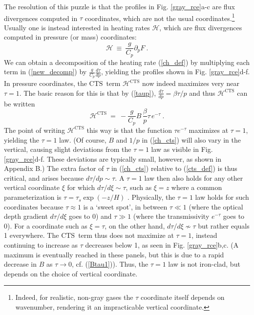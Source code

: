 \documentclass{ametsoc}
\newcommand{\beqn}{\begin{equation}}
\newcommand{\eeqn}{\end{equation}}
\newcommand{\eqnref}[1]{(\ref{#1})}
\newcommand{\der}[2]{\ensuremath{\frac{d #1}{d #2}}}
\newcommand{\ppp}{\ensuremath{\partial_p}}
\newcommand{\Cp}{\ensuremath{C_p}}
\newcommand{\ch}{\ensuremath{\mathcal{H}}}
\newcommand{\taus}{\ensuremath{\tau_s}}
\newcommand{\CTS}{\ensuremath{\mathrm{CTS}}}
\begin{document}
The resolution of this puzzle is that  the profiles in Fig. \ref{gray_rce}a-c are flux divergences computed in $\tau$ coordinates, which are not the usual coordinates.\footnote{Indeed, for realistic, non-gray gases the $\tau$ coordinate itself depends on wavenumber, rendering it an impracticable vertical coordinate.} Usually one is instead interested in heating rates \ch, which are flux divergences computed in pressure (or mass) coordinates:
\beqn
	\ch \ \equiv \ \frac{g}{\Cp}  \ppp F \ .
	\label{ch_def}
\eeqn 
 We can obtain a decomposition of the heating rate \eqnref{ch_def} by multiplying each term in \eqnref{new_decomp} by $\frac{g}{\Cp}\der{\tau}{p}$, yielding the profiles shown in Fig. \ref{gray_rce}d-f. In pressure coordinates, the \CTS\ term $\ch^{\CTS}$ now indeed maximizes very near $\tau=1$. The basic reason for this is that by \eqnref{taup}, $\der{\tau}{p} = \beta \tau/p$ and thus $\ch^{\CTS}$ can be written
\beqn
	\ch^{\CTS} \ = \ -\frac{g}{\Cp}B\, \frac{\beta}{p}\tau\, e^{-\tau} \ .
	\label{ch_cts}
\eeqn
The point of writing $\ch^{\CTS}$ this way is that  the function $\tau e^{-\tau}$ maximizes at $\tau=1$, yielding the $\tau=1$ law. (Of course, $B$ and $1/p$ in \eqnref{ch_cts} will also vary in the vertical, causing slight deviations from the $\tau=1$ law as visible in Fig. \ref{gray_rce}d-f. These deviations are typically small, however, as shown in Appendix B.) The extra factor of $\tau$ in \eqnref{ch_cts} relative to \eqnref{cts_def} is thus critical, and arises because $d \tau/dp \sim \tau$. A $\tau=1$ law then also holds for any other vertical coordinate $\xi$ for which $d \tau/d\xi \sim \tau$, such as $\xi=z$ where a common parameterization is $\tau=\taus \exp(-z/H)$  \citep[e.g.][]{huang2014,weaver1995,held1982}.  Physically, the $\tau=1$ law holds for such coordinates because $\tau\approx 1$ is a `sweet spot', in between $\tau \ll 1$ (where the optical depth gradient $d \tau/d\xi$ goes to 0) and $\tau \gg 1$  (where the transmissivity $e^{-\tau}$ goes to 0). For a coordinate such as $\xi=\tau$, on the other hand, $d \tau/d\xi \nsim\tau$ but rather equals 1 everywhere. The \CTS\ term thus does not maximize at $\tau=1$, instead continuing to increase as $\tau$ decreases below 1, as seen in Fig. \ref{gray_rce}b,c. (A maximum is eventually reached in these panels, but this is due to a rapid decrease in $B$ as $\tau\rightarrow 0$, cf. \eqnref{Btau1}). Thus, the $\tau=1$ law is not iron-clad, but depends on the choice of vertical coordinate.
\end{document}
